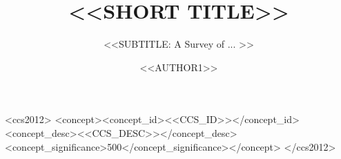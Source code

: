 \documentclass[acmsmall,screen,nonacm]{acmart}
\begin{document}
\title{<<SHORT TITLE>>}
\subtitle{<<SUBTITLE: A Survey of ... >>}

\author{<<AUTHOR1>>}
\renewcommand{\shortauthors}{<<Lastname>> et al.}



\begin{CCSXML}
<ccs2012>
   <concept><concept_id><<CCS_ID>></concept_id>
   <concept_desc><<CCS_DESC>></concept_desc>
   <concept_significance>500</concept_significance></concept>
</ccs2012>
\end{CCSXML}
\maketitle





\clearpage

\end{document}
